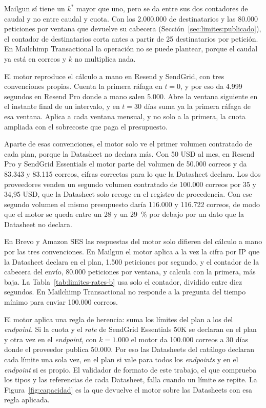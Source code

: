 Mailgun sí tiene un $k^{*}$ mayor que uno, pero se da entre sus dos contadores de caudal y no entre caudal y cuota.
Con los 2.000.000 de destinatarios y las 80.000 peticiones por ventana que devuelve su cabecera (Sección~\ref{sec:limites:publicado}), el contador de destinatarios corta antes a partir de 25 destinatarios por petición.
En Mailchimp Transactional la operación no se puede plantear, porque el caudal ya está en correos y $k$ no multiplica nada.

El motor reproduce el cálculo a mano en Resend y SendGrid, con tres convenciones propias.
Cuenta la primera ráfaga en $t = 0$, y por eso da 4.999 segundos en Resend Pro donde a mano salen 5.000.
Abre la ventana siguiente en el instante final de un intervalo, y en $t = 30$ días suma ya la primera ráfaga de esa ventana.
Aplica a cada ventana mensual, y no solo a la primera, la cuota ampliada con el sobrecoste que paga el presupuesto.

Aparte de esas convenciones, el motor solo ve el primer volumen contratado de cada plan, porque la Datasheet no declara más.
Con 50 USD al mes, en Resend Pro y SendGrid Essentials el motor parte del volumen de 50.000 correos y da 83.343 y 83.115 correos, cifras correctas para lo que la Datasheet declara.
Los dos proveedores venden un segundo volumen contratado de 100.000 correos por 35 y 34,95 USD, que la Datasheet solo recoge en el registro de procedencia.
Con ese segundo volumen el mismo presupuesto daría 116.000 y 116.722 correos, de modo que el motor se queda entre un 28 y un 29~\% por debajo por un dato que la Datasheet no declara.

En Brevo y Amazon SES las respuestas del motor solo difieren del cálculo a mano por las tres convenciones.
En Mailgun el motor aplica a la vez la cifra por IP que la Datasheet declara en el plan, 1.500 peticiones por segundo, y el contador de la cabecera del envío, 80.000 peticiones por ventana, y calcula con la primera, más baja.
La Tabla~\ref{tab:limites-rates-b} usa solo el contador, dividido entre diez segundos.
En Mailchimp Transactional no responde a la pregunta del tiempo mínimo para enviar 100.000 correos.

El motor aplica una regla de herencia: suma los límites del plan a los del \textit{endpoint}.
Si la cuota y el \textit{rate} de SendGrid Essentials 50K se declaran en el plan y otra vez en el \textit{endpoint}, con $k = 1.000$ el motor da 100.000 correos a 30 días donde el proveedor publica 50.000.
Por eso las Datasheets del catálogo declaran cada límite una sola vez, en el plan si vale para todos los \textit{endpoints} y en el \textit{endpoint} si es propio.
El validador de formato de este trabajo, el que comprueba los tipos y las referencias de cada Datasheet, falla cuando un límite se repite.
La Figura~\ref{fig:capacidad} es la que devuelve el motor sobre las Datasheets con esa regla aplicada.

